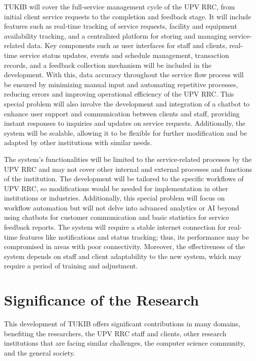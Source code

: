TUKIB will cover the full-service management cycle of the UPV RRC, from initial client service requests to the completion and feedback stage. It will include features such as real-time tracking of service requests, facility and equipment availability tracking, and a centralized platform for storing and managing service-related data. Key components such as user interfaces for staff and clients, real-time service status updates, events and schedule management, transaction records, and a feedback collection mechanism will be included in the development. With this, data accuracy throughout the service flow process will be ensured by minimizing manual input and automating repetitive processes, reducing errors and improving operational efficiency of the UPV RRC. This special problem will also involve the development and integration of a chatbot to enhance user support and communication between clients and staff, providing instant responses to inquiries and updates on service requests. Additionally, the system will be scalable, allowing it to be flexible for further modification and be adapted by other institutions with similar needs.

The system’s functionalities will be limited to the service-related processes by the UPV RRC and may not cover other internal and external processes and functions of the institution. The development will be tailored to the specific workflows of UPV RRC, so modifications would be needed for implementation in other institutions or industries. Additionally, this special problem will focus on workflow automation but will not delve into advanced analytics or AI beyond using chatbots for customer communication and basic statistics for service feedback reports. The system will require a stable internet connection for real-time features like notifications and status tracking; thus, its performance may be compromised in areas with poor connectivity. Moreover, the effectiveness of the system depends on staff and client adaptability to the new system, which may require a period of training and adjustment.

\section{Significance of the Research}
\label{sec:significance}

This development of TUKIB offers significant contributions in many domains, benefiting the researchers, the UPV RRC staff and clients, other research institutions that are facing similar challenges, the computer science community, and the general society.

